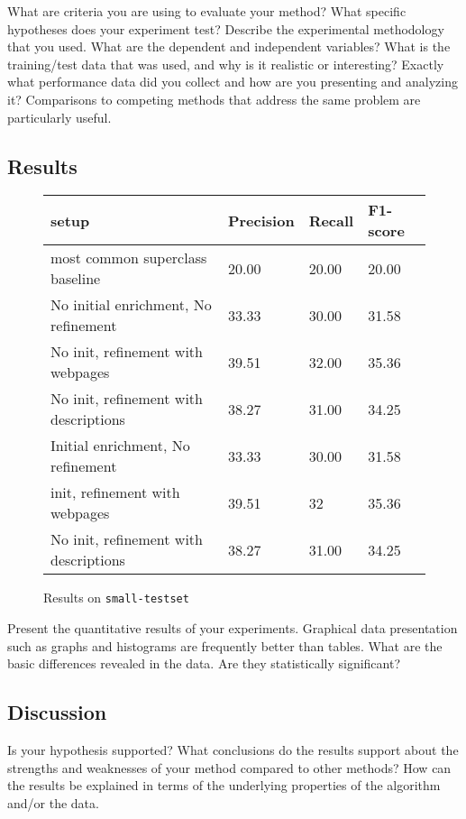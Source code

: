 \documentclass{article}
\begin{document}
What are criteria you are using to evaluate your method? What specific hypotheses does your experiment test? Describe the experimental methodology that you used. What are the dependent and independent variables? What is the training/test data that was used, and why is it realistic or interesting? Exactly what performance data did you collect and how are you presenting and analyzing it? Comparisons to competing methods that address the same problem are particularly useful. 

\subsection{Results}

\begin{center}
\begin{figure}[hbtp]
\begin{tabular}{|l| l| l| l|}
\hline
{\bf setup} & {\bf Precision} & {\bf Recall} & {\bf F1-score}  \\
\hline \hline
most common superclass baseline & 20.00 & 20.00 & 20.00 \\
\hline
No initial enrichment, No refinement & 33.33 & 30.00 & 31.58 \\
\hline
No init, refinement with webpages & 39.51 & 32.00 & 35.36 \\
\hline
No init, refinement with descriptions & 38.27 & 31.00 & 34.25 \\
\hline
Initial enrichment, No refinement & 33.33 & 30.00 & 31.58 \\
\hline
init, refinement with webpages & 39.51 & 32 & 35.36 \\
\hline
No init, refinement with descriptions & 38.27 & 31.00 & 34.25 \\
\hline
\end{tabular}
\caption{Results on {\tt small-testset}}
\label{fig:res1}
\end{figure}
\end{center}

Present the quantitative results of your experiments. Graphical data presentation such as graphs and histograms are frequently better than tables. What are the basic differences revealed in the data. Are they statistically significant? 

\subsection{Discussion}

Is your hypothesis supported? What conclusions do the results support about the strengths and weaknesses of your method compared to other methods? How can the results be explained in terms of the underlying properties of the algorithm and/or the data. 
\end{document}
